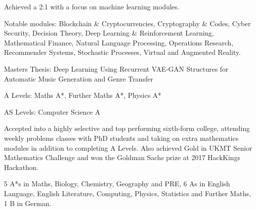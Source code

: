 \documentclass[9pt,a4paper,ragged2e,withhyper]{altacv}
\begin{document}
\begin{paracol}{2}

Achieved a 2:1 with a focus on machine learning modules. 

Notable modules: Blockchain \& Cryptocurrencies, Cryptography \& Codes, Cyber Security, Decision Theory, Deep Learning \& Reinforcement Learning, Mathematical Finance, Natural Language Processing, Operations Research, Recommender Systems, Stochastic Processes, Virtual and Augmented Reality. 

Masters Thesis: Deep Learning Using Recurrent VAE-GAN Structures for Automatic Music Generation and Genre Transfer

\medskip

A Levels: Maths A*, Further Maths A*, Physics A*

AS Levels: Computer Science A

Accepted into a highly selective and top performing sixth-form college, attending weekly problems classes with PhD students and taking on extra mathematics modules in addition to completing A Levels. Also achieved Gold in UKMT Senior Mathematics Challenge and won the Goldman Sachs prize at 2017 HackKings Hackathon.

\medskip


5 A*s in Maths, Biology, Chemistry, Geography and PRE, 6 As in English Language, English Literature, Computing, Physics, Statistics and Further Maths, 1 B in German.


\end{paracol}
\end{document}
